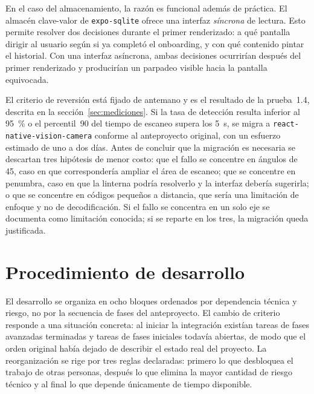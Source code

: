 En el caso del almacenamiento, la razón es funcional además de práctica. El almacén
clave-valor de \texttt{expo-sqlite} ofrece una interfaz \emph{síncrona} de lectura.
Esto permite resolver dos decisiones durante el primer renderizado: a qué pantalla
dirigir al usuario según si ya completó el onboarding, y con qué contenido pintar el
historial. Con una interfaz asíncrona, ambas decisiones ocurrirían después del primer
renderizado y producirían un parpadeo visible hacia la pantalla equivocada.

El criterio de reversión está fijado de antemano y es el resultado de la prueba~1.4,
descrita en la sección~\ref{sec:mediciones}. Si la tasa de detección resulta inferior
al 95~\% o el percentil~90 del tiempo de escaneo supera los 5~s, se migra a
\texttt{react-native-vision-camera} conforme al anteproyecto original, con un esfuerzo
estimado de uno a dos días. Antes de concluir que la migración es necesaria se
descartan tres hipótesis de menor costo: que el fallo se concentre en ángulos de
45\textdegree, caso en que correspondería ampliar el área de escaneo; que se concentre
en penumbra, caso en que la linterna podría resolverlo y la interfaz debería
sugerirla; o que se concentre en códigos pequeños a distancia, que sería una
limitación de enfoque y no de decodificación. Si el fallo se concentra en un solo eje
se documenta como limitación conocida; si se reparte en los tres, la migración queda
justificada.

\section{Procedimiento de desarrollo}

El desarrollo se organiza en ocho bloques ordenados por dependencia técnica y riesgo,
no por la secuencia de fases del anteproyecto. El cambio de criterio responde a una
situación concreta: al iniciar la integración existían tareas de fases avanzadas
terminadas y tareas de fases iniciales todavía abiertas, de modo que el orden original
había dejado de describir el estado real del proyecto. La reorganización se rige por
tres reglas declaradas: primero lo que desbloquea el trabajo de otras personas,
después lo que elimina la mayor cantidad de riesgo técnico y al final lo que depende
únicamente de tiempo disponible.

